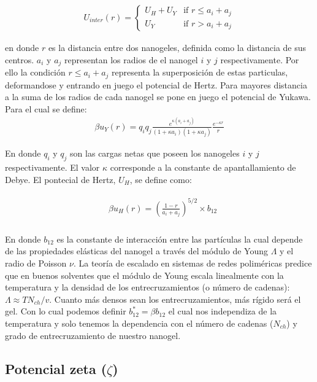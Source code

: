 \begin{align}
	U_{inter}(r) = \begin{cases} U_H + U_Y & \text{if } r \leq a_i + a_j \\ U_Y & \text{if } r > a_i + a_j \end{cases} 
	\label{eq:HY-potential}
\end{align}

en donde $r$ es la distancia entre dos nanogeles, definida como la distancia de sus centros. 
$a_i$ y $a_j$ representan los radios de el nanogel $i$ y $j$ respectivamente. Por ello la condici\'on $r \leq a_i +a_j$ representa la superposici\'on de estas particulas, deformandose y entrando en juego el potencial de Hertz.
Para mayores distancia a la suma de los radios de cada nanogel se pone en juego el potencial de Yukawa. Para el cual se define:
\begin{align}
	\beta u_Y(r) = q_i q_j \frac{e^{\kappa(a_i + a_j)}}{(1 +\kappa a_i)(1 + \kappa a_j)} \frac{e^{-\kappa r}}{r} 
	\label{eq:yukawa}
\end{align}

En donde $q_i$ y $q_j$ son las cargas netas que poseen los nanogeles $i$ y $j$ respectivamente. El valor $\kappa$ corresponde a la constante de apantallamiento de Debye. 
El pontecial de Hertz, $U_H$, se define como:
 

\begin{align}
	\begin{aligned}
		& \beta u_H (r) = \left(\frac{1-r}{a_i + a_j}\right)^{5/2}\times b_{12} \\
	\end{aligned}
\end{align}


En donde $b_{12}$ es la constante de interacci\'on entre las part\'iculas la cual depende de las propiedades el\'asticas del nanogel a trav\'es del m\'odulo de Young $\Lambda$ y el radio de Poisson $\nu$. \addcite[landau] La teor\'ia de escalado en sistemas de redes polim\'ericas predice que en buenos solventes \addcite que el m\'odulo de Young  escala linealmente con la temperatura y la densidad de los entrecruzamientos (o n\'umero de cadenas): $\Lambda \approx TN_{ch}/v$. Cuanto m\'as densos sean los entrecruzamientos, m\'as r\'igido ser\'a el gel.
Con lo cual podemos definir $b_{12}^\ast = \beta b_{12}$ el cual nos independiza de la temperatura y solo tenemos la dependencia con el n\'umero de cadenas ($N_{ch}$) y grado de entrecruzamiento de nuestro nanogel. 


\subsection{Potencial zeta ($\zeta$)}



